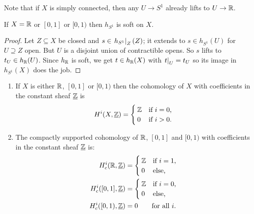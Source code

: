 \documentclass[../main.tex]{subfiles}
\begin{document}
\begin{rmk}
    Note that if $X$ is simply connected, then any $U\to S^1$ already lifts to $U\to \mathbb{R}$.
\end{rmk}


\begin{lem}
    If $X = \mathbb{R}$ or $[0,1]$ or $[0,1)$ then $h_{S^1}$ is soft on $X$.
\end{lem}

\begin{proof}
    Let $Z\subseteq X$ be closed and $s\in \left.h_{S^1}\right|_{Z}(Z)$; it extends to $s\in h_{S^1}(U)$ for $U\supseteq Z$ open. But $U$ is a disjoint union of contractible opens. So $s$ lifts to $t_U \in h_{\mathbb{R}}(U)$. Since $h_{\mathbb{R}}$ is soft, we get $t\in h_{\mathbb{R}}(X)$ with $\left.t\right|_{U} = t_U$ so its image in $h_{S^1}(X)$ does the job.
\end{proof}

\begin{cor}\label{cor:computation-cohomology-interval-real-line}
    \begin{enumerate}
        \item If $X$ is either $\mathbb{R}$, $[0,1]$ or $[0,1)$ then the cohomology of \(X\) with coefficients in the constant sheaf \(\underline{\mathbb{Z}}\) is $$\cohomology^i(X, \underline{\bb Z}) = \begin{cases}
            \bb Z & \text{if } i = 0\text{,} \\ 
            0 & \text{if } i>0\text{.}
        \end{cases}$$
        \item The compactly supported cohomology of \(\mathbb{R}\), \([0,1]\) and \([0,1)\) with coefficients in the constant sheaf \(\underline{\mathbb{Z}}\) is:
        \begin{align*}
            \cohomology^i_c(\bb R, \underline{\bb Z}) &= \begin{cases}
                \bb Z & \text{if } i = 1\text{,} \\
                0 & \text{else,}
            \end{cases} \\
            \cohomology^i_c([0,1], \underline{\bb Z}) &= \begin{cases}
                \bb Z & \text{if } i = 0\text{,} \\
                0 & \text{else,}
            \end{cases} \\
            \cohomology^i_c([0,1), \underline{\bb Z}) &= 0 \qquad \text{for all } i\text{.}
        \end{align*}
    \end{enumerate}
\end{cor}
\end{document}

